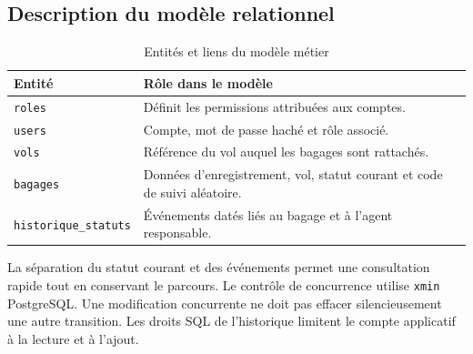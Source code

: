 \documentclass[11pt]{extarticle}
\begin{document}
\subsection{Description du modèle relationnel}
\begin{table}[H]\centering\caption{Entités et liens du modèle métier}
\begin{tabular}{p{4cm}p{9.5cm}}\toprule
\textbf{Entité} & \textbf{Rôle dans le modèle}\\\midrule
\texttt{roles} & Définit les permissions attribuées aux comptes.\\
\texttt{users} & Compte, mot de passe haché et rôle associé.\\
\texttt{vols} & Référence du vol auquel les bagages sont rattachés.\\
\texttt{bagages} & Données d'enregistrement, vol, statut courant et code de suivi aléatoire.\\
\texttt{historique\_statuts} & Événements datés liés au bagage et à l'agent responsable.\\\bottomrule
\end{tabular}\end{table}
La séparation du statut courant et des événements permet une consultation rapide tout en conservant le parcours. Le contrôle de concurrence utilise \texttt{xmin} PostgreSQL. Une modification concurrente ne doit pas effacer silencieusement une autre transition. Les droits SQL de l'historique limitent le compte applicatif à la lecture et à l'ajout.
\end{document}
